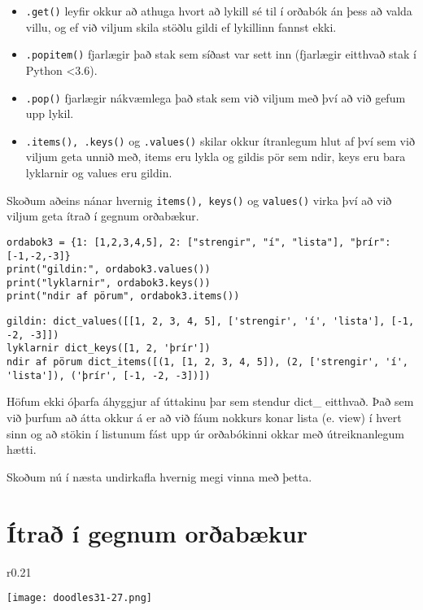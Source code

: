 \begin{itemize}
\item[] \texttt{.get()} leyfir okkur að athuga hvort að lykill sé til í orðabók án þess að valda villu, og ef við viljum skila stöðlu gildi ef lykillinn fannst ekki.
\item[] \texttt{.popitem()} fjarlægir það stak sem síðast var sett inn (fjarlægir eitthvað stak í Python <3.6).
\item[] \texttt{.pop()} fjarlægir nákvæmlega það stak sem við viljum með því að við gefum upp lykil.
\item[] \texttt{.items(), .keys()} og \texttt{.values()} skilar okkur ítranlegum hlut af því sem við viljum geta unnið með, items eru lykla og gildis pör sem ndir, keys eru bara lyklarnir og values eru gildin.
\end{itemize}

Skoðum aðeins nánar hvernig \texttt{items(), keys()} og \texttt{values()} virka því að við viljum geta ítrað í gegnum orðabækur.

\begin{lstlisting}[caption=Aðferðir á orðabækur, label=lst:dict-kynnt3]
ordabok3 = {1: [1,2,3,4,5], 2: ["strengir", "í", "lista"], "þrír": [-1,-2,-3]}
print("gildin:", ordabok3.values())
print("lyklarnir", ordabok3.keys())
print("ndir af pörum", ordabok3.items())
\end{lstlisting}
\lstset{style=uttak}
\begin{lstlisting}
gildin: dict_values([[1, 2, 3, 4, 5], ['strengir', 'í', 'lista'], [-1, -2, -3]])
lyklarnir dict_keys([1, 2, 'þrír'])
ndir af pörum dict_items([(1, [1, 2, 3, 4, 5]), (2, ['strengir', 'í', 'lista']), ('þrír', [-1, -2, -3])])
\end{lstlisting}
\lstset{style=venjulegt}

Höfum ekki óþarfa áhyggjur af úttakinu þar sem stendur dict\_ eitthvað.
Það sem við þurfum að átta okkur á er að við fáum nokkurs konar lista (e. view) í hvert sinn og að stökin í listunum fást upp úr orðabókinni okkar með útreiknanlegum hætti.

Skoðum nú í næsta undirkafla hvernig megi vinna með þetta.

\section{Ítrað í gegnum orðabækur}
 \begin{wrapfigure}{r}{0.21\textwidth} %
	\begin{center}
		\texttt{[image: doodles31-27.png]}
	\end{center}
\end{wrapfigure}

